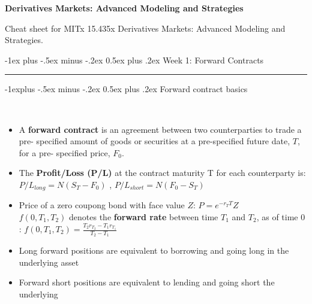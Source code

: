 \documentclass[10pt,landscape,a4paper]{article}
\makeatletter
\renewcommand{\section}{\@startsection{section}{1}{0mm}%
                                {-1ex plus -.5ex minus -.2ex}%
                                {0.5ex plus .2ex}%
                                {\normalfont\large\bfseries}}
\renewcommand{\subsection}{\@startsection{subsection}{2}{0mm}%
                                {-1explus -.5ex minus -.2ex}%
                                {0.5ex plus .2ex}%
                                {\normalfont\normalsize\bfseries}}
\makeatother
\begin{document}
\raggedright
\footnotesize
\begin{multicols*}{3}

\setlength{\premulticols}{1pt}
\setlength{\postmulticols}{1pt}
\setlength{\multicolsep}{1pt}
\setlength{\columnsep}{1pt}


\begin{center}
    {\color{blue} \Large{\textbf{Derivatives Markets: Advanced Modeling and Strategies}}} 
\end{center}


\scriptsize

Cheat sheet for MITx 15.435x Derivatives Markets: Advanced Modeling and Strategies.



\section{Week 1: Forward Contracts}\smallskip \hrule height 1pt \smallskip

\subsection{Forward contract basics}

\begin{description}[topsep=0pt]
	\item[Forward Contract] ~
	\begin{itemize}[topsep=0pt]
		\item A \textbf{forward contract} is an agreement between two counterparties to trade a pre-
		specified amount of goods or securities at a pre-specified future date, $T$, for a pre-
		specified price, $F_0$.
		\item The \textbf{Profit/Loss (P/L)} at the contract maturity T for each counterparty is:
		$P/L_{long} = N (S_T - F_0)$  , $P/L_{short} = N (F_0- S_T)$    
		\item  Price of a zero coupong bond with face value $Z$:  $P=e^{-r_T T}Z $\\
		$f(0,T_1,T_2)$ 	denotes the \textbf{forward rate} between time $T_1$ and $T_2$, as of
		time 0 : $f(0,T_1,T_2) = \frac{T_2 r_{T_2} - T_1 r_{T_1}}{T_2-T_1}$  
		\item Long forward positions are equivalent to borrowing and going long
		in the underlying asset
		\item Forward short positions are equivalent to lending and going short
		the underlying		
	\end{itemize}
\end{description}
 

\end{multicols*}
\end{document}
